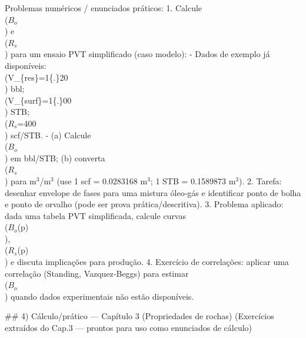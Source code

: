 \documentclass[11pt,a4paper]{article}
\begin{document}
\begin{enumerate}
{Problemas numéricos / enunciados práticos:
1. Calcule \\($B_{o}$\\) e \\($R_{s}$\\) para um ensaio PVT simplificado (caso modelo):  
	- Dados de exemplo já disponíveis: \\(V_\{res\}=1\{.\}20\\) bbl; \\(V_\{surf\}=1\{.\}00\\) STB; \\($R_{s}$=400\\) scf/STB.  
	- (a) Calcule \\($B_{o}$\\) em bbl/STB; (b) converta \\($R_{s}$\\) para m$^3$/m$^3$ (use 1 scf = 0.0283168 m$^3$; 1 STB = 0.1589873 m$^3$).
2. Tarefa: desenhar envelope de fases para uma mistura óleo‑gás e identificar ponto de bolha e ponto de orvalho (pode ser prova prática/descritiva).
3. Problema aplicado: dada uma tabela PVT simplificada, calcule curvas \\($B_{o}$(p)\\), \\($R_{s}$(p)\\) e discuta implicações para produção.
4. Exercício de correlações: aplicar uma correlação (Standing, Vazquez‑Beggs) para estimar \\($B_{o}$\\) quando dados experimentais não estão disponíveis.


## 4) Cálculo/prático — Capítulo 3 (Propriedades de rochas)
(Exercícios extraídos do Cap.3 — prontos para uso como enunciados de cálculo)

}
\end{enumerate}
\end{document}
